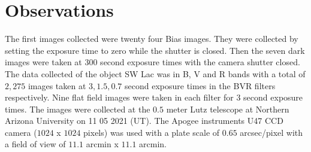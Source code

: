 \section{Observations}
\label{sec:obs}

The first images collected were twenty four Bias images. They were collected by setting the 
exposure time to zero while the shutter is closed. Then the seven dark images were taken at 
300 second exposure times with the camera shutter closed. The data collected of the object 
SW Lac was in B, V and R bands with a total of $2,275$ images taken at $3, 1.5, 0.7$ second 
exposure times in the BVR filters respectively. Nine flat field images were taken in each 
filter for 3 second exposure times. The images were collected at the $0.5$ meter Lutz telescope
 at Northern Arizona University on 11 05 2021 (UT). The Apogee instruments U47 CCD camera 
 ($1024$ x $1024$ pixels) was used with a plate scale of $0.65$ arcsec/pixel with a field of view 
 of $11.1$ arcmin x $ 11.1$ arcmin. 